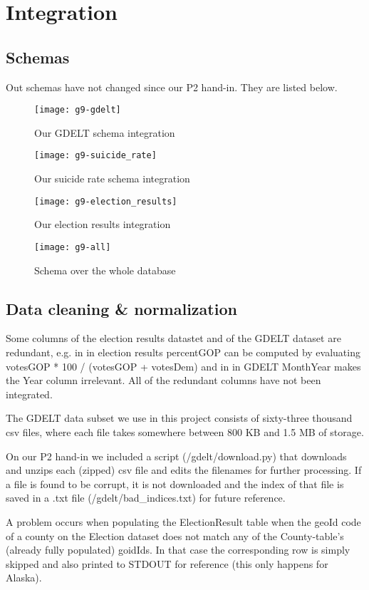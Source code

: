\section{Integration}


\subsection{Schemas}
Out schemas have not changed since our P2 hand-in. They are listed below.

\begin{figure}
	\centering
	\texttt{[image: g9-gdelt]}
	\caption{Our GDELT schema integration}
	\label{fig:gdelt}
\end{figure}

\begin{figure}
	\centering
	\texttt{[image: g9-suicide\_rate]}
	\caption{Our suicide rate schema integration}
	\label{fig:suicide_rate}
\end{figure}

\begin{figure}
	\centering
	\texttt{[image: g9-election\_results]}
	\caption{Our election results integration}
	\label{fig:election_results}
\end{figure}

\begin{figure}
	\centering
	\texttt{[image: g9-all]}
	\caption{Schema over the whole database}
	\label{fig:all}
\end{figure}

\subsection{Data cleaning \& normalization}
Some columns of the election results datastet and of the GDELT
dataset are redundant, e.g. in in election results percentGOP
can be computed by evaluating votesGOP * 100 / (votesGOP + votesDem)
and in in GDELT MonthYear makes the Year column irrelevant.
All of the redundant columns have not been integrated.

The GDELT data subset we use in this project consists of sixty-three
thousand csv files, where each file takes somewhere between
800 KB and 1.5 MB of storage.

On our P2 hand-in we included a script
(/gdelt/download.py) that downloads and unzips each (zipped) csv file
and edits the filenames for further processing.
If a file is found to be corrupt, it is not downloaded and
the index of that file is saved in a .txt file
(/gdelt/bad\_indices.txt) for future reference.

A problem occurs when populating the ElectionResult table when
the geoId code of a county on the Election dataset does not
match any of the County-table's (already fully populated) goidIds.
In that case the corresponding
row is simply skipped and also printed to STDOUT for reference
(this only happens for Alaska).
